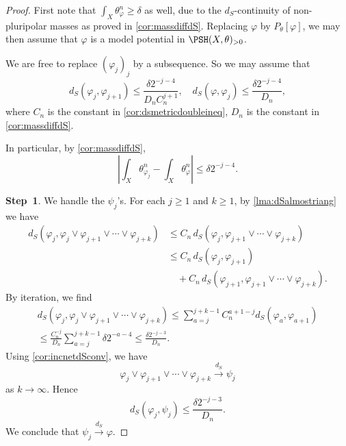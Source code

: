 \begin{proof}
    First note that $\int_X \theta_{\varphi}^n\geq \delta$ as well, due to the $d_S$-continuity of non-pluripolar masses as proved in \cref{cor:massdiffdS}. Replacing $\varphi$ by $P_{\theta}[\varphi]$, we may then assume that $\varphi$ is a model potential in $\PSH(X,\theta)_{>0}$.

    We are free to replace $(\varphi_j)_j$ by a subsequence. So we may assume that
    \begin{equation}\label{eq:conditiononvarphijtemp1}
    d_S(\varphi_j,\varphi_{j+1})\leq \frac{\delta 2^{-j-4}}{D_n C_n^{j+1}},\quad d_S(\varphi,\varphi_j)\leq \frac{\delta 2^{-j-4}}{D_n},
    \end{equation}
    where $C_n$ is the constant in \cref{cor:dsmetricdoubleineq}, $D_n$ is the constant in \cref{cor:massdiffdS}.

    In particular, by \cref{cor:massdiffdS},
    \begin{equation}\label{eq:varphijvarphimassdiffbdd}
        \left|\int_X \theta_{\varphi_j}^n-\int_X \theta_{\varphi}^n\right|\leq \delta 2^{-j-4}.
    \end{equation}

    \textbf{Step~1}. We handle the $\psi_j$'s. For each $j\geq 1$ and $k\geq 1$, by \cref{lma:dSalmostriang} we have
    \[
    \begin{aligned}
    d_S(\varphi_j,\varphi_j\lor\varphi_{j+1}\lor\cdots\lor \varphi_{j+k})
    &\leq C_n\,d_S(\varphi_j,\varphi_{j+1}\lor\cdots\lor \varphi_{j+k})\\
    &\leq C_n\,d_S(\varphi_j,\varphi_{j+1})\\
    &\quad + C_n\,d_S(\varphi_{j+1},\varphi_{j+1}\lor\cdots\lor \varphi_{j+k}).
    \end{aligned}
    \]
    By iteration, we find
    \[
    \begin{split}
        d_S(\varphi_j,\varphi_j\lor\varphi_{j+1}\lor\cdots\lor \varphi_{j+k})\leq \sum_{a=j}^{j+k-1}C_n^{a+1-j}d_S(\varphi_a,\varphi_{a+1})\\
        \leq \frac{C_n^{-j}}{D_n}\sum_{a=j}^{j+k-1}\delta 2^{-a-4}\leq \frac{\delta 2^{-j-3}}{D_n}.
    \end{split}
    \]
    Using \cref{cor:incnetdSconv}, we have
    \[
        \varphi_j\lor\varphi_{j+1}\lor\cdots\lor \varphi_{j+k}\xrightarrow{d_S}\psi_j
    \]
    as $k\to\infty$. Hence
    \begin{equation}\label{eq:dsvarphijpsijesttemp1}
        d_S(\varphi_j,\psi_j)\leq \frac{\delta 2^{-j-3}}{D_n}.
    \end{equation}
    We conclude that $\psi_j\xrightarrow{d_S}\varphi$.


\end{proof}
